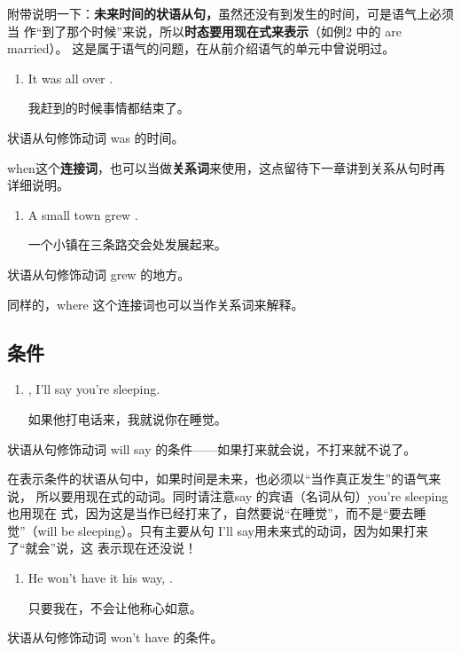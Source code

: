 附带说明一下：\textbf{未来时间的状语从句，}虽然还没有到发生的时间，可是语气上必须当
作“到了那个时候”来说，所以\textbf{时态要用现在式来表示}（如例2 中的 are married）。
这是属于语气的问题，在从前介绍语气的单元中曾说明过。

\begin{enumerate}[resume]
\item It was all over  .

  我赶到的时候事情都结束了。
\end{enumerate}
状语从句修饰动词 was 的时间。

when这个\textbf{连接词}，也可以当做\textbf{关系词}来使用，这点留待下一章讲到关系从句时再
详细说明。

\begin{enumerate}[resume]
\item A small town grew  .

  一个小镇在三条路交会处发展起来。
\end{enumerate}
状语从句修饰动词 grew 的地方。

同样的，where 这个连接词也可以当作关系词来解释。

\subsection{条件}

\begin{enumerate}
\item {} , I'll say you're
  sleeping.

  如果他打电话来，我就说你在睡觉。
\end{enumerate}
状语从句修饰动词 will say 的条件——如果打来就会说，不打来就不说了。

在表示条件的状语从句中，如果时间是未来，也必须以“当作真正发生”的语气来说，
所以要用现在式的动词。同时请注意say 的宾语（名词从句）you're sleeping也用现在
式，因为这是当作已经打来了，自然要说“在睡觉”，而不是“要去睡觉”（will be
sleeping）。只有主要从句 I'll say用未来式的动词，因为如果打来了“就会”说，这
表示现在还没说！

\begin{enumerate}[resume]
\item He won't have it his way,  .

  只要我在，不会让他称心如意。
\end{enumerate}
状语从句修饰动词 won't have 的条件。

